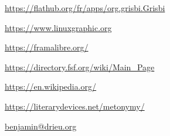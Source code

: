 \urldef{\urlFlatpakGrisbi}%
\url{https://flathub.org/fr/apps/org.grisbi.Grisbi}

\urldef{\urlLinuxGraphic}%
\url{https://www.linuxgraphic.org}

\urldef{\urlFramasoftLogiciels}%
\url{https://framalibre.org/}

\urldef{\urlFreeSoftwareDirectory}%
\url{https://directory.fsf.org/wiki/Main_Page}







\urldef{\urlWikipedia}%
\url{https://en.wikipedia.org/}

\urldef{\urlMetonymyDef}%
\url{https://literarydevices.net/metonymy/}






\urldef{\urlBenjaminDrieuEmail}%
\url{benjamin@drieu.org}     %


